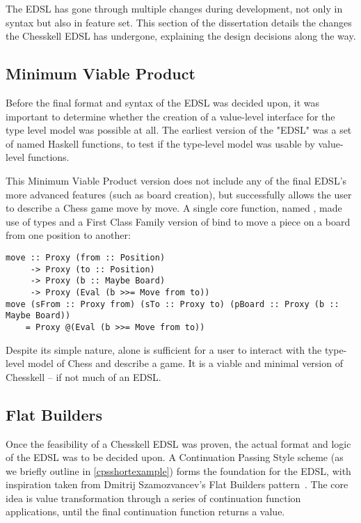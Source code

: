 The EDSL has gone through multiple changes during development, not only in syntax but also in feature set. This section of the dissertation details the changes the Chesskell EDSL has undergone, explaining the design decisions along the way.

\subsection{Minimum Viable Product}

Before the final format and syntax of the EDSL was decided upon, it was important to determine whether the creation of a value-level interface for the type level model was possible at all. The earliest version of the "EDSL" was a set of named Haskell functions, to test if the type-level model was usable by value-level functions.

This Minimum Viable Product version does not include any of the final EDSL's more advanced features (such as board creation), but successfully allows the user to describe a Chess game move by move. A single core function, named , made use of  types and a First Class Family version of bind to move a piece on a board from one position to another:

\begin{lstlisting}
move :: Proxy (from :: Position)
     -> Proxy (to :: Position)
     -> Proxy (b :: Maybe Board)
     -> Proxy (Eval (b >>= Move from to))
move (sFrom :: Proxy from) (sTo :: Proxy to) (pBoard :: Proxy (b :: Maybe Board))
    = Proxy @(Eval (b >>= Move from to))
\end{lstlisting}

Despite its simple nature,  alone is sufficient for a user to interact with the type-level model of Chess and describe a game. It is a viable and minimal version of Chesskell -- if not much of an EDSL.

\subsection{Flat Builders}

Once the feasibility of a Chesskell EDSL was proven, the actual format and logic of the EDSL was to be decided upon. A Continuation Passing Style scheme (as we briefly outline in \cref{cpsshortexample}) forms the foundation for the EDSL, with inspiration taken from Dmitrij Szamozvancev's Flat Builders pattern~\cite{mezzo}. The core idea is value transformation through a series of continuation function applications, until the final continuation function returns a value.

